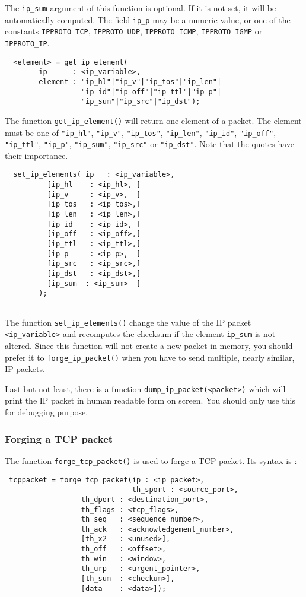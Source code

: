 \documentclass{article}
\begin{document}
The \verb+ip_sum+ argument of this function is optional. If it is not set, it
will be automatically computed. The field \verb+ip_p+ may be a numeric value, or
one of the constants \verb+IPPROTO_TCP+, \verb+IPPROTO_UDP+,
\verb+IPPROTO_ICMP+, \verb+IPPROTO_IGMP+ or \verb+IPPROTO_IP+.


\begin{verbatim}
  <element> = get_ip_element(
 		ip      : <ip_variable>,
 		element : "ip_hl"|"ip_v"|"ip_tos"|"ip_len"|
 		          "ip_id"|"ip_off"|"ip_ttl"|"ip_p"|
 		          "ip_sum"|"ip_src"|"ip_dst");
\end{verbatim}

The function \verb+get_ip_element()+ will return one element 
of a packet. The element must be one of \verb+"ip_hl"+, \verb+"ip_v"+,
 \verb+"ip_tos"+, \verb+"ip_len"+,
 \verb+"ip_id"+, \verb+"ip_off"+, \verb+"ip_ttl"+, \verb+"ip_p"+,  \verb+"ip_sum"+,
  \verb+"ip_src"+ or \verb+"ip_dst"+. Note that the quotes have their importance.

\begin{verbatim}
  set_ip_elements( ip	: <ip_variable>,
		  [ip_hl    : <ip_hl>, ]
		  [ip_v     : <ip_v>,  ]
		  [ip_tos   : <ip_tos>,]
		  [ip_len   : <ip_len>,]
		  [ip_id    : <ip_id>, ]
		  [ip_off   : <ip_off>,]
		  [ip_ttl   : <ip_ttl>,]
		  [ip_p     : <ip_p>,  ]
		  [ip_src   : <ip_src>,]
		  [ip_dst   : <ip_dst>,]
		  [ip_sum  : <ip_sum>  ] 
		);
		
\end{verbatim}

The function \verb+set_ip_elements()+ change the value of the IP packet
\verb+<ip_variable>+ and recomputes the checksum if the element
\verb+ip_sum+ is not altered.
Since this function will not create a new packet in memory, you
should prefer it to \verb+forge_ip_packet()+ when you have to send
multiple, nearly similar, IP packets.


Last but not least, there is a function \verb+dump_ip_packet(<packet>)+ which
will print the IP packet in human readable form on screen. You should only
use this for debugging purpose.


\subsubsection{Forging a TCP packet}

The function \verb+forge_tcp_packet()+ is used to forge a TCP packet.
Its syntax is :
\begin{verbatim}
 tcppacket = forge_tcp_packet(ip : <ip_packet>,
                              th_sport : <source_port>,
			      th_dport : <destination_port>,
			      th_flags : <tcp_flags>,
			      th_seq   : <sequence_number>,
			      th_ack   : <acknowledgement_number>,
			      [th_x2   : <unused>],
			      th_off   : <offset>,
			      th_win   : <window>,
			      th_urp   : <urgent_pointer>,
			      [th_sum  : <checkum>],
			      [data    : <data>]);
			      
\end{verbatim}
\end{document}

